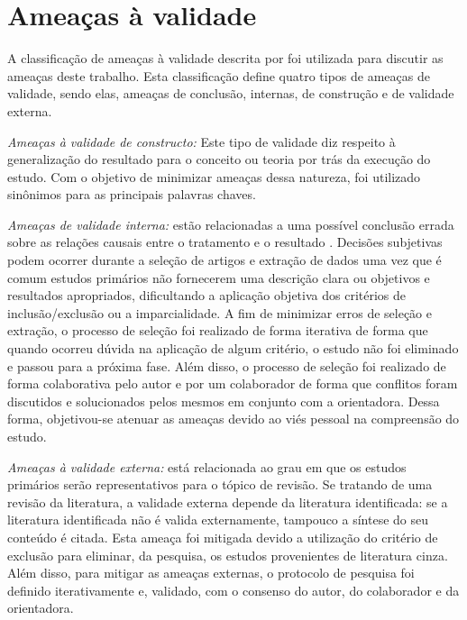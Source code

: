     \section{Ameaças à validade} 
        
        A classificação de ameaças à validade descrita por \cite{Wohlin2000} foi utilizada para discutir as ameaças deste trabalho. Esta classificação define quatro tipos de ameaças de validade, sendo elas, ameaças de conclusão, internas, de construção e de validade externa.
        
        \emph{Ameaças à validade de constructo:} Este tipo de validade diz respeito à generalização do resultado para o conceito ou teoria por trás da execução do estudo. Com o objetivo de minimizar ameaças dessa natureza, foi utilizado sinônimos para as principais palavras chaves.
        
       \emph{Ameaças de validade interna:} estão relacionadas a uma possível conclusão errada sobre as relações causais entre o tratamento e o resultado \cite{Wohlin2000}. Decisões subjetivas podem ocorrer durante a seleção de artigos e extração de dados uma vez que é comum estudos primários não fornecerem uma descrição clara ou objetivos e resultados apropriados, dificultando a aplicação objetiva dos critérios de inclusão/exclusão ou a imparcialidade. A fim de minimizar erros de seleção e extração, o processo de seleção foi realizado de forma iterativa de forma que quando ocorreu dúvida na aplicação de algum critério, o estudo não foi eliminado e passou para a próxima fase. Além disso, o processo de seleção foi realizado de forma colaborativa pelo autor e por um colaborador de forma que conflitos foram discutidos e solucionados pelos mesmos em conjunto com a orientadora. Dessa forma, objetivou-se atenuar as ameaças devido ao viés pessoal na compreensão do estudo.
        
        \emph{Ameaças à validade externa:} está relacionada ao grau em que os estudos primários serão representativos para o tópico de revisão. Se tratando de uma revisão da literatura, a validade externa depende da literatura identificada: se a literatura identificada não é valida externamente, tampouco a síntese do seu conteúdo é citada. Esta ameaça foi mitigada devido a utilização do critério de exclusão para eliminar, da pesquisa, os estudos provenientes de literatura cinza. Além disso, para mitigar as ameaças externas, o protocolo de pesquisa foi definido iterativamente e, validado, com o consenso do autor, do colaborador e da orientadora.  
        
